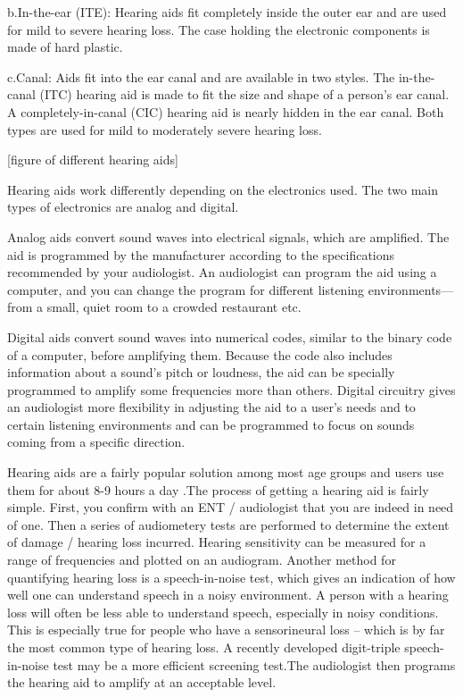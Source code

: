 \documentclass[sigconf]{acmart}
\begin{document}
b.In-the-ear (ITE):
Hearing aids fit completely inside the outer ear and are used for mild to severe hearing loss. The case holding the electronic components is made of hard plastic. 

c.Canal:
Aids fit into the ear canal and are available in two styles. The in-the-canal (ITC) hearing aid is made to fit the size and shape of a person’s ear canal. A completely-in-canal (CIC) hearing aid is nearly hidden in the ear canal. Both types are used for mild to moderately severe hearing loss.

[figure of different hearing aids]

Hearing aids work differently depending on the electronics used. The two main types of electronics are analog and digital.

Analog aids convert sound waves into electrical signals, which are amplified. The aid is programmed by the manufacturer according to the specifications recommended by your audiologist. An audiologist can program the aid using a computer, and you can change the program for different listening environments—from a small, quiet room to a crowded restaurant etc.

Digital aids convert sound waves into numerical codes, similar to the binary code of a computer, before amplifying them. Because the code also includes information about a sound’s pitch or loudness, the aid can be specially programmed to amplify some frequencies more than others. Digital circuitry gives an audiologist more flexibility in adjusting the aid to a user’s needs and to certain listening environments and can be programmed to focus on sounds coming from a specific direction.

Hearing aids are a fairly popular solution among most age groups and users use them for about 8-9 hours a day \cite{Audiol.2017}.The process of getting a hearing aid is fairly simple. First, you confirm with an ENT / audiologist that you are indeed in need of one. Then a series of audiometery tests are performed to determine the extent of damage / hearing loss incurred. Hearing sensitivity can be measured for a range of frequencies and plotted on an audiogram. Another method for quantifying hearing loss is a speech-in-noise test, which gives an indication of how well one can understand speech in a noisy environment. A person with a hearing loss will often be less able to understand speech, especially in noisy conditions. This is especially true for people who have a sensorineural loss – which is by far the most common type of hearing loss.  A recently developed digit-triple speech-in-noise test may be a more efficient screening test.The audiologist then programs the hearing aid to amplify at an acceptable level.
\end{document}

